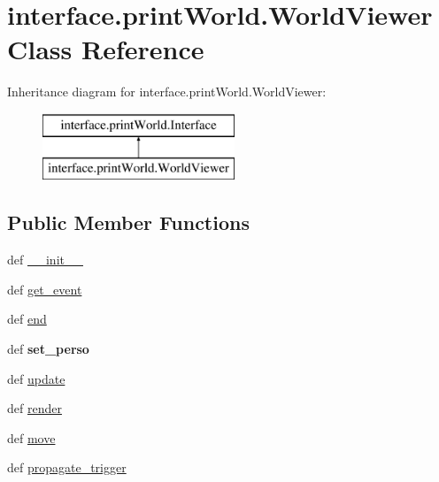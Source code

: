 \hypertarget{classinterface_1_1print_world_1_1_world_viewer}{\section{interface.\-print\-World.\-World\-Viewer \-Class \-Reference}
\label{classinterface_1_1print_world_1_1_world_viewer}
}
\-Inheritance diagram for interface.\-print\-World.\-World\-Viewer\-:\begin{figure}[H]
\begin{center}
\leavevmode
\includegraphics[height=2.000000cm]{classinterface_1_1print_world_1_1_world_viewer}
\end{center}
\end{figure}
\subsection*{\-Public \-Member \-Functions}
\begin{DoxyCompactItemize}
\item 
def \hyperlink{classinterface_1_1print_world_1_1_world_viewer_a29df52052f8f790a3e1308d102210186}{\-\_\-\-\_\-init\-\_\-\-\_\-}
\item 
def \hyperlink{classinterface_1_1print_world_1_1_world_viewer_adada0d39c5e5f93da8d50722a04e7b92}{get\-\_\-event}
\item 
def \hyperlink{classinterface_1_1print_world_1_1_world_viewer_a060018a5214380bf5e539a8742a34201}{end}
\item 
\hypertarget{classinterface_1_1print_world_1_1_world_viewer_a6fe7808a1e9b09c56d1838ff36a3f8f2}{def {\bfseries set\-\_\-perso}}\label{classinterface_1_1print_world_1_1_world_viewer_a6fe7808a1e9b09c56d1838ff36a3f8f2}

\item 
def \hyperlink{classinterface_1_1print_world_1_1_world_viewer_a9cc6b5953ef4bfcfca631b6a94554cac}{update}
\item 
def \hyperlink{classinterface_1_1print_world_1_1_world_viewer_a16f9b59c20fd0e54125da6d4cbcc373e}{render}
\item 
def \hyperlink{classinterface_1_1print_world_1_1_world_viewer_a29cbfc89a67d46a31ca889cf481d5e2f}{move}
\item 
def \hyperlink{classinterface_1_1print_world_1_1_world_viewer_a14fd62fb5ee0b63011028e1e84cf19f4}{propagate\-\_\-trigger}
\end{DoxyCompactItemize}
